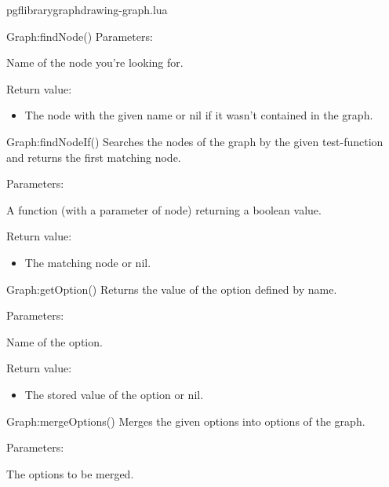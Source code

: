 \begin{filedescription}{pgflibrarygraphdrawing-graph.lua}
\begin{luacommand}{{Graph:findNode}()}
Parameters:
\begin{parameterdescription}
	\item[\meta{name}] Name of the node you're looking for.
\end{parameterdescription}


Return value:
\begin{itemize} \item[] The node with the given name or nil if it wasn't contained in the graph. \end{itemize}


\end{luacommand}\begin{luacommand}{{Graph:findNodeIf}()}
Searches the nodes of the graph by the given test-function and returns the first matching node.

Parameters:
\begin{parameterdescription}
	\item[\meta{test}] A function (with a parameter of node) returning a boolean value.
\end{parameterdescription}


Return value:
\begin{itemize} \item[] The matching node or nil. \end{itemize}


\end{luacommand}\begin{luacommand}{{Graph:getOption}()}
Returns the value of the option defined by name.

Parameters:
\begin{parameterdescription}
	\item[\meta{name}] Name of the option.
\end{parameterdescription}


Return value:
\begin{itemize} \item[] The stored value of the option or nil. \end{itemize}


\end{luacommand}\begin{luacommand}{{Graph:mergeOptions}()}
Merges the given options into options of the graph.

Parameters:
\begin{parameterdescription}
	\item[\meta{options}] The options to be merged.
\end{parameterdescription}




\end{luacommand}
\end{filedescription}
